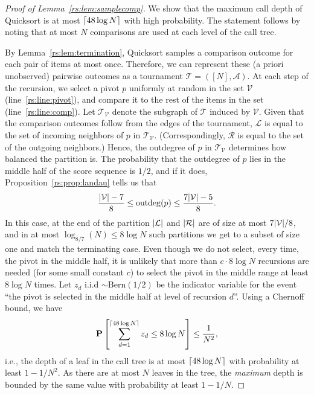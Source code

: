 \begin{proof}[Proof of Lemma~\ref{rs:lem:samplecomp}]
We show that the maximum call depth of Quicksort is at most $\lceil48 \log N\rceil$ with high probability.
The statement follows by noting that at most $N$ comparisons are used at each level of the call tree.

By Lemma~\ref{rs:lem:termination}, Quicksort samples a comparison outcome for each pair of items at most once.
Therefore, we can represent these (a priori unobserved) pairwise outcomes as a tournament $\mathcal{T} = ([N], \mathcal{A})$.
At each step of the recursion, we select a pivot $p$ uniformly at random in the set $\mathcal{V}$ (line~\ref{rs:line:pivot}), and compare it to the rest of the items in the set (line~\ref{rs:line:comp}).
Let $\mathcal{T}_{\mathcal{V}}$ denote the subgraph of $\mathcal{T}$ induced by $\mathcal{V}$.
Given that the comparison outcomes follow from the edges of the tournament, $\mathcal{L}$ is equal to the set of incoming neighbors of $p$ in $\mathcal{T}_{\mathcal{V}}$.
(Correspondingly, $\mathcal{R}$ is equal to the set of the outgoing neighbors.)
Hence, the outdegree of $p$ in $\mathcal{T}_\mathcal{V}$ determines how balanced the partition is.
The probability that the outdegree of $p$ lies in the middle half of the score sequence is $1/2$, and if it does, Proposition~\ref{rs:prop:landau} tells us that
\begin{align*}
\frac{\lvert\mathcal{V}\rvert - 7}{8} \le \mathrm{outdeg}(p) \le \frac{7 \lvert\mathcal{V}\rvert - 5}{8}.
\end{align*}
In this case, at the end of the partition $\lvert\mathcal{L}\rvert$ and $\lvert\mathcal{R}\rvert$ are of size at most $7\lvert\mathcal{V}\rvert/8$, and in at most $\log_{8/7}(N) \le 8 \log N $ such partitions we get to a subset of size one and match the terminating case.
Even though we do not select, every time, the pivot in the middle half, it is unlikely that more than $c \cdot 8 \log N$ recursions are needed (for some small constant $c$) to select the pivot in the middle range at least $8 \log N$ times.
Let $z_d$ i.i.d $\sim \text{Bern}(1/2)$ be the indicator variable for the event ``the pivot is selected in the middle half at level of recursion $d$''.
Using a Chernoff bound, we have
\begin{align*}
\mathbf{P}\left[ \sum_{d=1}^{\lceil48 \log N\rceil} z_d \le 8 \log N \right] \le \frac{1}{N^2},
\end{align*}
i.e., the depth of a leaf in the call tree is at most $\lceil48 \log N\rceil$ with probability at least $1 - 1/N^2$.
As there are at most $N$ leaves in the tree, the \emph{maximum} depth is bounded by the same value with probability at least $1 - 1/N$.
\end{proof}

